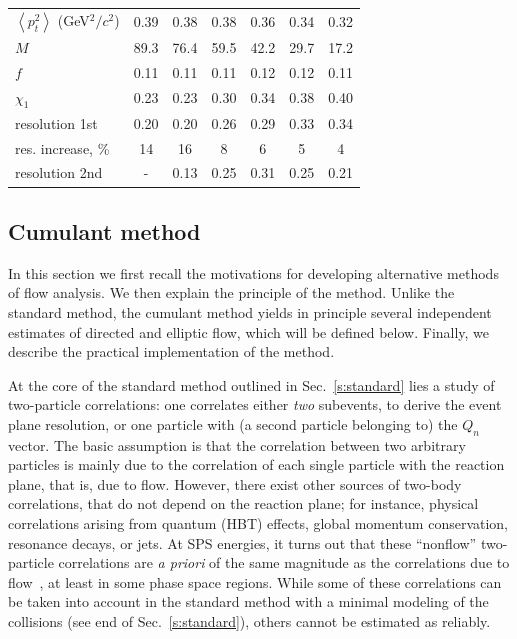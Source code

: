 \documentclass[aps,prc,superscriptaddress,showpacs,floatfix,nofootinbib]{revtex4}
\newcommand{\mean}[1]{\left\langle #1 \right\rangle}
\begin{document}
\begin{table}[hbt!]
\begin{center}
\begin{ruledtabular}
\begin{tabular}{l|c|c|c|c|c|c}
$\mean{p_t^2}$ (GeV$^2/c^2$)  
                        & 0.39  & 0.38  & 0.38  & 0.36  & 0.34  & 0.32  \\
$M$                     & 89.3  & 76.4  & 59.5  & 42.2  & 29.7  & 17.2  \\
$f$                     & 0.11  & 0.11  & 0.11  & 0.12  & 0.12  & 0.11\\
$\chi_1$                & 0.23  & 0.23  & 0.30  & 0.34  & 0.38  & 0.40 \\
resolution 1st          & 0.20  & 0.20  & 0.26  & 0.29  & 0.33  & 0.34 \\
res. increase, \%       & 14    & 16    & 8     & 6     & 5     & 4  \\
resolution 2nd          & -     & 0.13  & 0.25  & 0.31  & 0.25  & 0.21 \\
\end{tabular}
\end{ruledtabular}
\end{center}
\label{tbl:momcons}
\end{table}


\subsection{Cumulant method}
\label{s:cumulant}

In this section we first recall the motivations for developing
alternative methods of flow analysis. We then explain the principle of
the method. Unlike the standard method, the cumulant method yields in
principle several independent estimates of directed and elliptic flow,
which will be defined below.  Finally, we describe the practical
implementation of the method.


At the core of the standard method outlined in Sec.~\ref{s:standard}
lies a study of two-particle correlations: one correlates either {\em
two} subevents, to derive the event plane resolution, or one particle
with (a second particle belonging to) the $Q_n$ vector. The basic
assumption is that the correlation between two arbitrary particles is
mainly due to the correlation of each single particle with the
reaction plane, that is, due to flow. However, there exist other
sources of two-body correlations, that do not depend on the reaction
plane; for instance, physical correlations arising from quantum (HBT)
effects, global momentum conservation, resonance decays, or jets. At
SPS energies, it turns out that these ``nonflow'' two-particle
correlations are {\em a priori} of the same magnitude as the
correlations due to flow~\cite{Dinh:1999mn,Borghini:2000cm}, at least
in some phase space regions. While some of these correlations can be
taken into account in the standard method with a minimal modeling of
the collisions (see end of Sec.~\ref{s:standard}), others cannot be
estimated as reliably.
\end{document}
